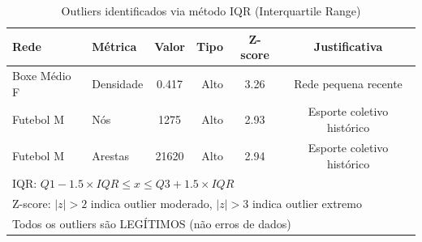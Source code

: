 \begin{table}[H]
\centering
\small
\caption{Outliers identificados via método IQR (Interquartile Range)}
\label{tab:outliers_iqr}
\begin{tabular}{llcrcc}
\hline
\textbf{Rede} & \textbf{Métrica} & \textbf{Valor} & \textbf{Tipo} & \textbf{Z-score} & \textbf{Justificativa} \\
\hline
Boxe Médio F & Densidade & 0.417 & Alto & 3.26 & Rede pequena recente \\
Futebol M & Nós & 1275 & Alto & 2.93 & Esporte coletivo histórico \\
Futebol M & Arestas & 21620 & Alto & 2.94 & Esporte coletivo histórico \\
\hline
\multicolumn{6}{l}{\footnotesize IQR: $Q1 - 1.5 \times IQR \leq x \leq Q3 + 1.5 \times IQR$} \\
\multicolumn{6}{l}{\footnotesize Z-score: $|z| > 2$ indica outlier moderado, $|z| > 3$ indica outlier extremo} \\
\multicolumn{6}{l}{\footnotesize Todos os outliers são LEGÍTIMOS (não erros de dados)} \\
\end{tabular}
\end{table}
